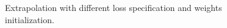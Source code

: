 \begin{figure}
  \centering
  
  \vspace{-0.8cm}
\caption{Extrapolation with different loss specification and weights initialization.\label{fig:smoothing}}
\end{figure}







